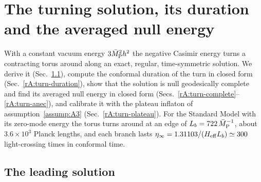 \section{The turning solution, its duration and the averaged null energy}\label{rep:turning}

With a constant vacuum energy $3\bar M_{\mathrm{P}}^2h^2$ the negative Casimir energy turns a contracting torus around along an exact, regular, time-symmetric solution.
We derive it (Sec.~\ref{rA:turn-solution}), compute the conformal duration of the turn in closed form (Sec.~\ref{rA:turn-duration}), show that the solution is null geodesically complete and find its averaged null energy in closed form (Secs.~\ref{rA:turn-complete}--\ref{rA:turn-anec}), and calibrate it with the plateau inflaton of assumption~\ref{assump:A3} (Sec.~\ref{rA:turn-plateau}).
For the Standard Model with its zero-mode energy the torus turns around at an edge of $L_b=722\,\bar M_{\mathrm{P}}^{-1}$, about $3.6\times10^3$ Planck lengths, and each branch lasts $\eta_\infty=1.31103/(H_{\mathrm{eff}}L_b)\simeq300$ light-crossing times in conformal time. %

\subsection{The leading solution}
\label{rA:turn-solution}

